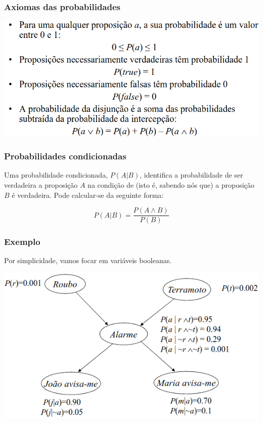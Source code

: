\documentclass{article}
\begin{document}
\subsubsection{Axiomas das probabilidades}

\begin{center}
  \includegraphics[scale=0.35]{47}
\end{center}

\subsubsection{Probabilidades condicionadas}

Uma probabilidade condicionada, $P(A|B)$, identifica a probabilidade de ser
verdadeira a proposição $A$ na condição de (isto é, sabendo nós que)
a proposição $B$ é verdadeira. Pode calcular-se da seguinte forma:

\[ P(A|B) = \frac{P(A \wedge B)}{P(B)} \]

\subsubsection{Exemplo}

Por simplicidade, vamos focar em variáveis booleanas.

\begin{center}
  \includegraphics[scale=0.4]{48}
\end{center}
\end{document}

